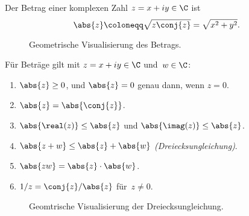 \documentclass[a4paper]{article}
\begin{document}
\begin{definition}[Betrag]
    Der Betrag einer komplexen Zahl $z = x+iy \in \C$ ist
    \begin{equation*}
        \abs{z} \coloneqq \sqrt{z\conj{z}} = \sqrt{x^2+y^2}.
    \end{equation*}
\end{definition}

\begin{figure}
    \caption{Geometrische Visualisierung des Betrags.}
\end{figure}

\begin{lemma}\label{lem:complex:absolute}
    Für Beträge gilt mit $z = x+iy \in \C$ und~$w \in \C$:
    \begin{enumerate}
        \item $\abs{z} \geq 0$, und $\abs{z} = 0$ genau dann, wenn $z = 0$.
        \item $\abs{z} = \abs{\conj{z}}$.
        \item $\abs{\real(z)} \leq \abs{z}$ und $\abs{\imag(z)} \leq \abs{z}$.
        \item $\abs{z+w} \leq \abs{z}+\abs{w}$ \emph{(Dreiecksungleichung)}.
        \item $\abs{zw} = \abs{z}\cdot\abs{w}$.
        \item $1/z = \conj{z}/\abs{z}$ für~$z \neq 0$.
    \end{enumerate}
\end{lemma}

\begin{figure}
    \caption{Geomtrische Visualisierung der Dreiecksungleichung.}
\end{figure}
\end{document}
